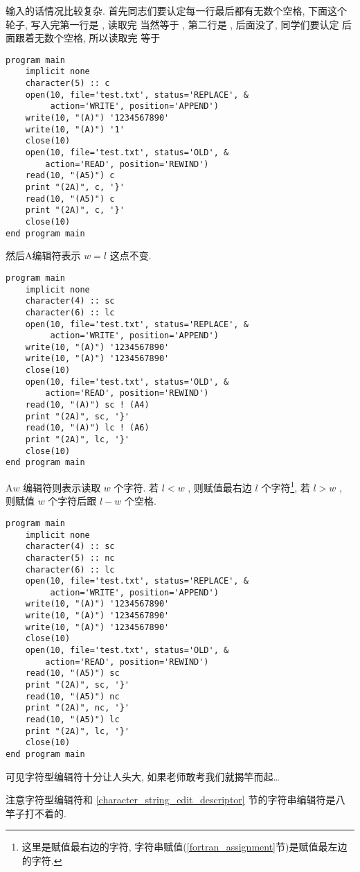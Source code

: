 输入的话情况比较复杂. 首先同志们要认定每一行最后都有无数个空格, 下面这个轮子, 写入完第一行是 , 读取完  当然等于 , 第二行是 , 后面没了, 同学们要认定  后面跟着无数个空格, 所以读取完  等于  
\begin{lstlisting}
program main
    implicit none
    character(5) :: c
    open(10, file='test.txt', status='REPLACE', &
         action='WRITE', position='APPEND')
    write(10, "(A)") '1234567890'
    write(10, "(A)") '1'
    close(10)
    open(10, file='test.txt', status='OLD', &
        action='READ', position='REWIND')
    read(10, "(A5)") c
    print "(2A)", c, '}'
    read(10, "(A5)") c
    print "(2A)", c, '}'
    close(10)
end program main
\end{lstlisting}
然后A编辑符表示 $ w=l $ 这点不变. 
\begin{lstlisting}
program main
    implicit none
    character(4) :: sc
    character(6) :: lc
    open(10, file='test.txt', status='REPLACE', &
         action='WRITE', position='APPEND')
    write(10, "(A)") '1234567890'
    write(10, "(A)") '1234567890'
    close(10)
    open(10, file='test.txt', status='OLD', &
        action='READ', position='REWIND')
    read(10, "(A)") sc ! (A4)
    print "(2A)", sc, '}'
    read(10, "(A)") lc ! (A6)
    print "(2A)", lc, '}'
    close(10)
end program main
\end{lstlisting}
A$ w $ 编辑符则表示读取 $ w $ 个字符. 若 $ l<w $ , 则赋值最右边 $ l $ 个字符\footnote{这里是赋值最右边的字符, 字符串赋值(\ref{fortran_assignment}节)是赋值最左边的字符.}, 若 $ l>w $ , 则赋值 $ w $ 个字符后跟 $ l-w $ 个空格. 
\begin{lstlisting}
program main
    implicit none
    character(4) :: sc
    character(5) :: nc
    character(6) :: lc
    open(10, file='test.txt', status='REPLACE', &
         action='WRITE', position='APPEND')
    write(10, "(A)") '1234567890'
    write(10, "(A)") '1234567890'
    write(10, "(A)") '1234567890'
    close(10)
    open(10, file='test.txt', status='OLD', &
        action='READ', position='REWIND')
    read(10, "(A5)") sc
    print "(2A)", sc, '}'
    read(10, "(A5)") nc
    print "(2A)", nc, '}'
    read(10, "(A5)") lc
    print "(2A)", lc, '}'
    close(10)
end program main
\end{lstlisting}

可见字符型编辑符十分让人头大, 如果老师敢考我们就揭竿而起\dots{}

注意字符型编辑符和 \ref{character_string_edit_descriptor} 节的字符串编辑符是八竿子打不着的. 

